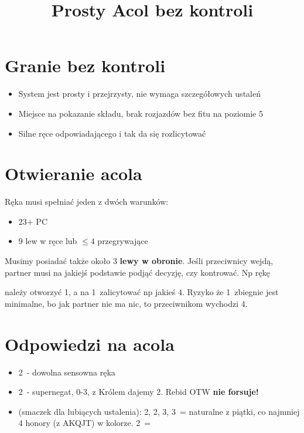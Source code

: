 \documentclass[12pt, a4paper]{article}
\author{}
\date{}
\title{Prosty Acol bez kontroli}
\begin{document}
\maketitle
\section{Granie bez kontroli}
\begin{itemize}
    \item System jest prosty i przejrzysty, nie wymaga szczegółowych ustaleń
    \item Miejsce na pokazanie składu, brak rozjazdów bez fitu na poziomie 5
    \item Silne ręce odpowiadającego i tak da się rozlicytować
\end{itemize}

\section{Otwieranie acola}
Ręka musi spełniać jeden z dwóch warunków:
\begin{itemize}
    \item 23+ PC
    \item 9 lew w ręce lub $\leq 4$ przegrywające
\end{itemize}

Musimy posiadać także około 3 \textbf{lewy w obronie}. Jeśli przeciwnicy wejdą, partner musi 
na jakiejś podstawie podjąć decyzję, czy kontrować. Np rękę
\begin{center}
\end{center}
należy otworzyć 1\spades, a na 1\nt\ zalicytować np jakieś 4\hearts. Ryzyko że 1\spades\ zbiegnie jest minimalne,
bo jak partner nie ma nic, to przeciwnikom wychodzi 4\hearts.

\section{Odpowiedzi na acola}
\begin{itemize}
    \item 2\diams\ - dowolna sensowna ręka
    \item 2\hearts\ - supernegat, 0-3\hcp, z Królem dajemy 2\diams. Rebid OTW \textbf{nie forsuje!}
    \item (smaczek dla lubiących ustalenia): 2\spades, 2\nt, 3\clubs, 3\diams\ = naturalne z piątki,
    co najmniej 4 honory (z AKQJT) w kolorze. 2\nt\ = \hearts
\end{itemize}
\end{document}
